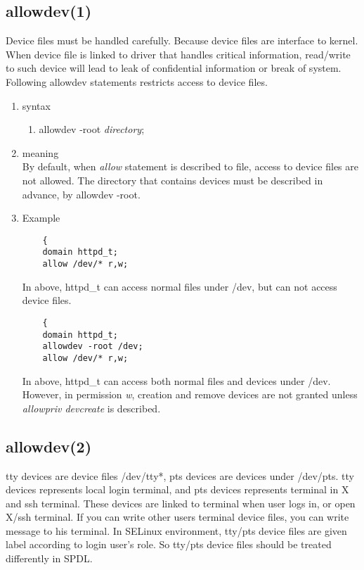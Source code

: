 \documentclass{article}
\begin{document}
\subsection{allowdev(1)}
 Device files must be handled carefully. Because device files are
interface to kernel. When device file is linked to driver that handles
critical information, read/write to such device will lead to leak of
confidential information or break of system. Following allowdev
statements restricts access to device files.
\begin{enumerate}
 \item syntax
      \begin{enumerate}
       \item allowdev -root {\it directory};
      \end{enumerate}
 \item meaning\\
	By default, when {\it allow} statement is described to file,
	access to device files are not allowed. The directory that
	contains devices must be described in advance, by allowdev
	-root.

 \item Example\\
       \begin{verbatim}
	{ 
	domain httpd_t;
	allow /dev/* r,w;
       \end{verbatim}
       In above, httpd\_t can access normal files under /dev, but can
       not access device files.
       \begin{verbatim}
	{ 
	domain httpd_t;
	allowdev -root /dev;
	allow /dev/* r,w;
       \end{verbatim}
       In above, httpd\_t can access both normal files and devices under
       /dev.
       However, in permission {\it w}, creation and remove devices are not granted unless {\it allowpriv devcreate } is described. 
\end{enumerate}

\subsection{allowdev(2)}
tty devices are device files /dev/tty*, pts devices are devices under
/dev/pts. tty devices represents local login terminal, and pts devices
represents terminal in X and ssh terminal. These devices are linked to
terminal when user logs in, or open X/ssh terminal. If you can write
other users terminal device files, you can write message to his
terminal. 
In SELinux environment, tty/pts device files are given label according to
login user's role. 
So tty/pts device files should be treated differently in SPDL.
\end{document}
